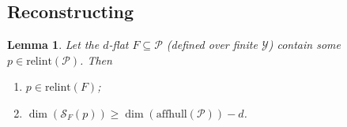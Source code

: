 \documentclass{article} %
\newcommand{\Comments}{0}
\newcommand{\mytodo}[2]{\ifnum\Comments=1%
	\todo[linecolor=#1!80!black,backgroundcolor=#1,bordercolor=#1!80!black]{#2}\fi}
\newcommand{\raft}[1]{\mytodo{green!20!white}{RF: #1}}
\newcommand{\jessiet}[1]{\mytodo{teal!20!white}{JF: #1}}
\newcommand{\relint}[1]{\mathrm{relint}(#1)}
\newcommand{\spn}{\mathrm{span}}
\newcommand{\affhull}{\mathrm{affhull}}
\renewcommand{\P}{\mathcal{P}}
\newcommand{\Scr}{\mathcal{S}}  %
\newcommand{\Y}{\mathcal{Y}}
\newtheorem{lemma}{Lemma}
\begin{document}
\subsection{Reconstructing \citet[Thm.\ 16]{ramaswamy2016convex}}\label{subapp:fsd-bound-reconsstruction}



\begin{lemma}\label{lem:finite-relint-dim}
  Let the $d$-flat $F\subseteq \P$ (defined over finite $\Y$) contain some $p\in\relint{\P}$.
  Then 
  \begin{enumerate}
  	\item[(i)] $p \in \relint{F}$; 
  	\item[(ii)] $\dim(\Scr_F(p)) \geq \dim(\affhull(\P)) - d$.
  \end{enumerate}
\end{lemma}
\end{document}
